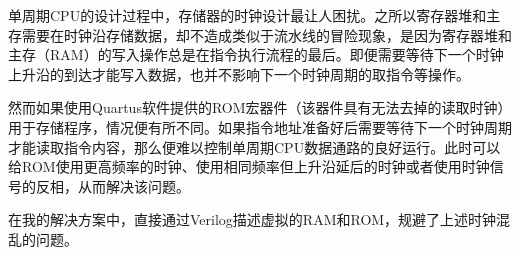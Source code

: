 \documentclass{hfutpaper}
\begin{document}
\par 单周期CPU的设计过程中，存储器的时钟设计最让人困扰。之所以寄存器堆和主存需要在时钟沿存储数据，却不造成类似于流水线的冒险现象，是因为寄存器堆和主存（RAM）的写入操作总是在指令执行流程的最后。即便需要等待下一个时钟上升沿的到达才能写入数据，也并不影响下一个时钟周期的取指令等操作。

\par 然而如果使用Quartus软件提供的ROM宏器件（该器件具有无法去掉的读取时钟）用于存储程序，情况便有所不同。如果指令地址准备好后需要等待下一个时钟周期才能读取指令内容，那么便难以控制单周期CPU数据通路的良好运行。此时可以给ROM使用更高频率的时钟、使用相同频率但上升沿延后的时钟或者使用时钟信号的反相，从而解决该问题。

\par 在我的解决方案中，直接通过Verilog描述虚拟的RAM和ROM，规避了上述时钟混乱的问题。
\end{document}
